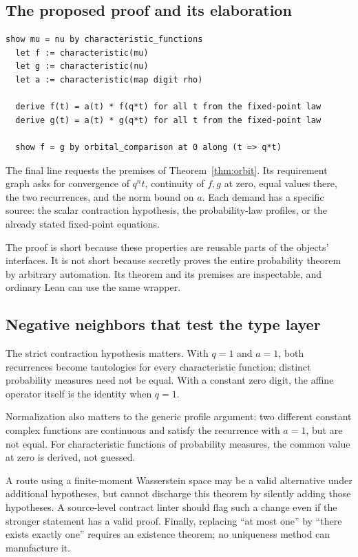 \documentclass[11pt,a4paper]{article}
\newcommand{\code}[1]{\texttt{\detokenize{#1}}}
\theoremstyle{definition}
\begin{document}
\subsection{The proposed proof and its elaboration}
\begin{lstlisting}
show mu = nu by characteristic_functions
  let f := characteristic(mu)
  let g := characteristic(nu)
  let a := characteristic(map digit rho)

  derive f(t) = a(t) * f(q*t) for all t from the fixed-point law
  derive g(t) = a(t) * g(q*t) for all t from the fixed-point law

  show f = g by orbital_comparison at 0 along (t => q*t)
\end{lstlisting}

The final line requests the premises of Theorem~\ref{thm:orbit}. Its requirement
graph asks for convergence of $q^nt$, continuity of $f,g$ at zero, equal values
there, the two recurrences, and the norm bound on $a$. Each demand has a
specific source: the scalar contraction hypothesis, the probability-law
profiles, or the already stated fixed-point equations.

The proof is short because these properties are reusable parts of the objects'
interfaces. It is not short because \code{orbital_comparison} secretly proves
the entire probability theorem by arbitrary automation. Its theorem and its
premises are inspectable, and ordinary Lean can use the same wrapper.

\subsection{Negative neighbors that test the type layer}
The strict contraction hypothesis matters. With $q=1$ and $a=1$, both
recurrences become tautologies for every characteristic function; distinct
probability measures need not be equal. With a constant zero digit, the affine
operator itself is the identity when $q=1$.

Normalization also matters to the generic profile argument: two different
constant complex functions are continuous and satisfy the recurrence with
$a=1$, but are not equal. For characteristic functions of probability measures,
the common value at zero is derived, not guessed.

A route using a finite-moment Wasserstein space may be a valid alternative
under additional hypotheses, but cannot discharge this theorem by silently
adding those hypotheses. A source-level contract linter should flag such a
change even if the stronger statement has a valid proof. Finally, replacing
``at most one'' by ``there exists exactly one'' requires an existence theorem;
no uniqueness method can manufacture it.
\end{document}
